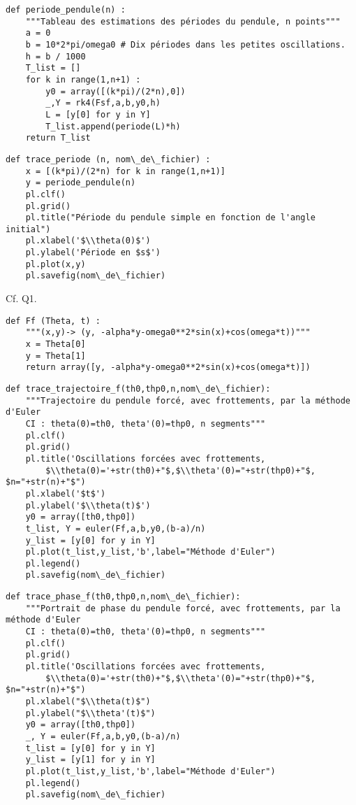 \question{}
\begin{lstlisting}
def periode_pendule(n) :
    """Tableau des estimations des périodes du pendule, n points"""
    a = 0
    b = 10*2*pi/omega0 # Dix périodes dans les petites oscillations.
    h = b / 1000
    T_list = []
    for k in range(1,n+1) :
        y0 = array([(k*pi)/(2*n),0])
        _,Y = rk4(Fsf,a,b,y0,h)
        L = [y[0] for y in Y]
        T_list.append(periode(L)*h)
    return T_list
\end{lstlisting}

\question{}
\begin{lstlisting}
def trace_periode (n, nom\_de\_fichier) :
    x = [(k*pi)/(2*n) for k in range(1,n+1)]
    y = periode_pendule(n)
    pl.clf()
    pl.grid()
    pl.title("Période du pendule simple en fonction de l'angle initial")
    pl.xlabel('$\\theta(0)$')
    pl.ylabel('Période en $s$')
    pl.plot(x,y)
    pl.savefig(nom\_de\_fichier)
\end{lstlisting}

\question{} Cf. Q1.

\question{}
\begin{lstlisting}
def Ff (Theta, t) :
    """(x,y)-> (y, -alpha*y-omega0**2*sin(x)+cos(omega*t))"""    
    x = Theta[0]
    y = Theta[1]
    return array([y, -alpha*y-omega0**2*sin(x)+cos(omega*t)])
\end{lstlisting}

\question{}
\begin{lstlisting}
def trace_trajectoire_f(th0,thp0,n,nom\_de\_fichier):
    """Trajectoire du pendule forcé, avec frottements, par la méthode d'Euler
    CI : theta(0)=th0, theta'(0)=thp0, n segments"""
    pl.clf()
    pl.grid()
    pl.title('Oscillations forcées avec frottements, 
        $\\theta(0)='+str(th0)+"$,$\\theta'(0)="+str(thp0)+"$, $n="+str(n)+"$")
    pl.xlabel('$t$')
    pl.ylabel('$\\theta(t)$')
    y0 = array([th0,thp0])
    t_list, Y = euler(Ff,a,b,y0,(b-a)/n)
    y_list = [y[0] for y in Y]
    pl.plot(t_list,y_list,'b',label="Méthode d'Euler")
    pl.legend()
    pl.savefig(nom\_de\_fichier)
\end{lstlisting}

\question{}
\begin{lstlisting}
def trace_phase_f(th0,thp0,n,nom\_de\_fichier):
    """Portrait de phase du pendule forcé, avec frottements, par la méthode d'Euler
    CI : theta(0)=th0, theta'(0)=thp0, n segments"""
    pl.clf()
    pl.grid()
    pl.title('Oscillations forcées avec frottements, 
        $\\theta(0)='+str(th0)+"$,$\\theta'(0)="+str(thp0)+"$, $n="+str(n)+"$")
    pl.xlabel("$\\theta(t)$")
    pl.ylabel("$\\theta'(t)$")
    y0 = array([th0,thp0])
    _, Y = euler(Ff,a,b,y0,(b-a)/n)
    t_list = [y[0] for y in Y]
    y_list = [y[1] for y in Y]
    pl.plot(t_list,y_list,'b',label="Méthode d'Euler")
    pl.legend()
    pl.savefig(nom\_de\_fichier)
\end{lstlisting}

